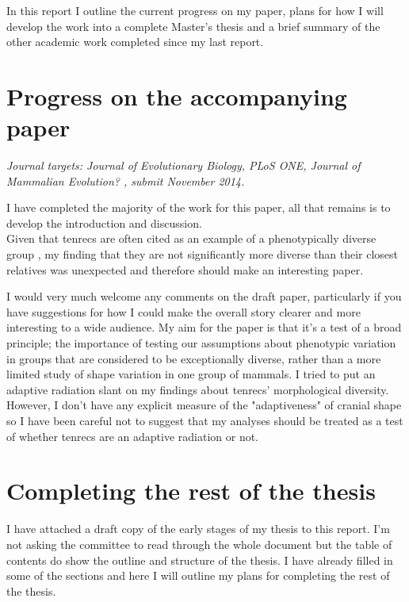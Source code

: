 \documentclass[12pt,a4paper]{article}
\begin{document}
	In this report I outline the current progress on my paper, plans for how I will develop the work into a complete Master's thesis and a brief summary of the other academic work completed since my last report.  

\section{Progress on the accompanying paper}

	\textit{Journal targets: Journal of Evolutionary Biology, PLoS ONE, Journal of Mammalian Evolution? , submit November 2014.} 

	I have completed the majority of the work for this paper, all that remains is to develop the introduction and discussion. \\
	Given that tenrecs are often cited as an example of a phenotypically diverse group \citep[e.g.][]{Olson2013}, my finding that they are not significantly more diverse than their closest relatives was unexpected and therefore should make an interesting paper.

	I would very much welcome any comments on the draft paper, particularly if you have suggestions for how I could make the overall story clearer and more interesting to a wide audience. My aim for the paper is that it's a test of a broad principle; the importance of testing our assumptions about phenotypic variation in groups that are considered to be exceptionally diverse, rather than a more limited study of shape variation in one group of mammals. I tried to put an adaptive radiation slant on my findings about tenrecs' morphological diversity. However, I don't have any explicit measure of the "adaptiveness" of cranial shape so I have been careful not to suggest that my analyses should be treated as a test of whether tenrecs are an adaptive radiation or not.



\section{Completing the rest of the thesis}

	I have attached a draft copy of the early stages of my thesis to this report. I'm not asking the committee to read through the whole document but the table of contents do show the outline and structure of the thesis. I have already filled in some of the sections and here I will outline my plans for completing the rest of the thesis.
\end{document}
